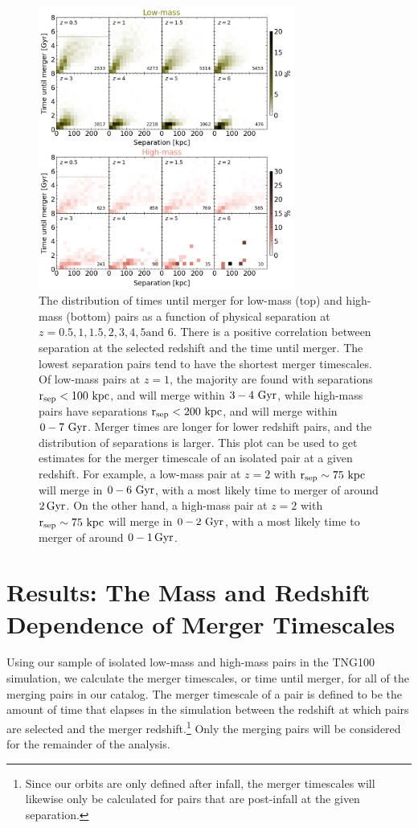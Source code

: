 \documentclass[twocolumn,linenumbers]{aastex631}
\begin{document}
\begin{figure}[htb]
    \begin{center}
    \includegraphics[width=0.75\textwidth]{plots/bet-on-it/8_2Dhist.png}
    \caption{The distribution of times until merger for low-mass (top) and high-mass (bottom) pairs as a function of physical separation at $z=0.5,1,1.5,2,3,4,5\mbox{and }6$. 
    There is a positive correlation between separation at the selected redshift and the time until merger. 
    The lowest separation pairs tend to have the shortest merger timescales.
    Of low-mass pairs at $z=1$, the majority are found with separations $\rm r_{sep}<100\,\mathrm{\,kpc}$, and will merge within $3-4\, \mathrm{\,Gyr}$, while high-mass pairs have separations $\rm r_{sep}<200\,\mathrm{\,kpc}$, and will merge within $0-7\, \mathrm{\,Gyr}$. 
    Merger times are longer for lower redshift pairs, and the distribution of separations is larger.
    This plot can be used to get estimates for the merger timescale of an isolated pair at a given redshift. 
    For example, a low-mass pair at $z=2$ with $\rm r_{sep}\sim 75\,\mathrm{\,kpc}$ will merge in $0-6\,\mathrm{\,Gyr}$, with a most likely time to merger of around $2\mathrm{\,Gyr}$.
    On the other hand, a high-mass pair at $z=2$ with $\rm r_{sep}\sim 75\,\mathrm{\,kpc}$ will merge in $0-2\,\mathrm{\,Gyr}$, with a most likely time to merger of around $0-1\mathrm{\,Gyr}$.
    }
    \label{fig:2dhist}
    \end{center}
\end{figure}

\section{Results: The Mass and Redshift Dependence of Merger Timescales}
    Using our sample of isolated low-mass and high-mass pairs in the TNG100 simulation, we calculate the merger timescales, or time until merger, for all of the merging pairs in our catalog. 
    The merger timescale of a pair is defined to be the amount of time that elapses in the simulation between the redshift at which pairs are selected and the merger redshift.\footnote{Since our orbits are only defined after infall, the merger timescales will likewise only be calculated for pairs that are post-infall at the given separation.}
    Only the merging pairs will be considered for the remainder of the analysis. 
    
\end{document}

